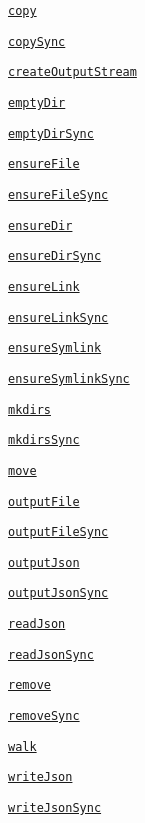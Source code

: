 \begin{DoxyItemize}
\item \href{#copy}{\tt copy}
\item \href{#copy}{\tt copy\+Sync}
\item \href{#createoutputstreamfile-options}{\tt create\+Output\+Stream}
\item \href{#emptydirdir-callback}{\tt empty\+Dir}
\item \href{#emptydirdir-callback}{\tt empty\+Dir\+Sync}
\item \href{#ensurefilefile-callback}{\tt ensure\+File}
\item \href{#ensurefilefile-callback}{\tt ensure\+File\+Sync}
\item \href{#ensuredirdir-callback}{\tt ensure\+Dir}
\item \href{#ensuredirdir-callback}{\tt ensure\+Dir\+Sync}
\item \href{#ensurelinksrcpath-dstpath-callback}{\tt ensure\+Link}
\item \href{#ensurelinksrcpath-dstpath-callback}{\tt ensure\+Link\+Sync}
\item \href{#ensuresymlinksrcpath-dstpath-type-callback}{\tt ensure\+Symlink}
\item \href{#ensuresymlinksrcpath-dstpath-type-callback}{\tt ensure\+Symlink\+Sync}
\item \href{#mkdirsdir-callback}{\tt mkdirs}
\item \href{#mkdirsdir-callback}{\tt mkdirs\+Sync}
\item \href{#movesrc-dest-options-callback}{\tt move}
\item \href{#outputfilefile-data-options-callback}{\tt output\+File}
\item \href{#outputfilefile-data-options-callback}{\tt output\+File\+Sync}
\item \href{#outputjsonfile-data-options-callback}{\tt output\+Json}
\item \href{#outputjsonfile-data-options-callback}{\tt output\+Json\+Sync}
\item \href{#readjsonfile-options-callback}{\tt read\+Json}
\item \href{#readjsonfile-options-callback}{\tt read\+Json\+Sync}
\item \href{#removedir-callback}{\tt remove}
\item \href{#removedir-callback}{\tt remove\+Sync}
\item \href{#walk}{\tt walk}
\item \href{#writejsonfile-object-options-callback}{\tt write\+Json}
\item \href{#writejsonfile-object-options-callback}{\tt write\+Json\+Sync}
\end{DoxyItemize}

